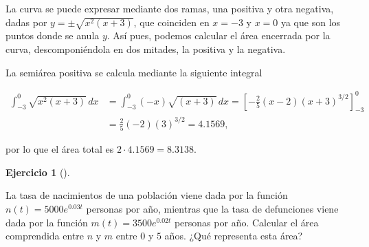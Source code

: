 \documentclass[
  a4paper,
]{scrreport}
\theoremstyle{definition}
\newtheorem{exercise}{Ejercicio}[chapter]
\theoremstyle{remark}
\begin{document}
\begin{tcolorbox}[enhanced jigsaw, colframe=quarto-callout-tip-color-frame, colbacktitle=quarto-callout-tip-color!10!white, opacitybacktitle=0.6, left=2mm, toptitle=1mm, coltitle=black, title=\textcolor{quarto-callout-tip-color}{\faLightbulb}\hspace{0.5em}{Solución}, leftrule=.75mm, opacityback=0, toprule=.15mm, colback=white, titlerule=0mm, arc=.35mm, rightrule=.15mm, bottomrule=.15mm, breakable, bottomtitle=1mm]

La curva se puede expresar mediante dos ramas, una positiva y otra
negativa, dadas por \(y=\pm \sqrt{x^2(x+3)}\), que coinciden en \(x=-3\)
y \(x=0\) ya que son los puntos donde se anula \(y\). Así pues, podemos
calcular el área encerrada por la curva, descomponiéndola en dos
mitades, la positiva y la negativa.

La semiárea positiva se calcula mediante la siguiente integral

\begin{align*}
\int_{-3}^0 \sqrt{x^2(x+3)}\,dx 
&= \int_{-3}^0 (-x)\sqrt{(x+3)}\,dx 
= \left[-\frac{2}{5}(x-2)(x+3)^{3/2}\right]_{-3}^0 \\
&= \frac{2}{5}(-2)(3)^{3/2} 
= 4.1569,
\end{align*}

por lo que el área total es \(2\cdot 4.1569 = 8.3138\).

\end{tcolorbox}

\begin{exercise}[]\protect\hypertarget{exr-crecimiento-población}{}\label{exr-crecimiento-población}

La tasa de nacimientos de una población viene dada por la función
\(n(t)=5000e^{0.03t}\) personas por año, mientras que la tasa de
defunciones viene dada por la función \(m(t)=3500 e^{0.02t}\) personas
por año. Calcular el área comprendida entre \(n\) y \(m\) entre \(0\) y
\(5\) años. ¿Qué representa esta área?

\end{exercise}
\end{document}
